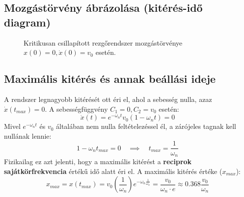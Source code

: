 \subsection*{Mozgástörvény ábrázolása (kitérés-idő diagram)}
\begin{figure}[H]
    \centering
    \caption{Kritikusan csillapított rezgőrendszer mozgástörvénye $x(0)=0, \dot{x}(0)=v_0$ esetén.}
\end{figure}

\newpage
\subsection*{Maximális kitérés és annak beállási ideje}
A rendszer legnagyobb kitérését ott éri el, ahol a sebesség nulla, azaz $\dot{x}(t_{max}) = 0$.
A sebességfüggvény $C_1 = 0, C_2 = v_0$ esetén:
\begin{equation}
    \dot{x}(t) = e^{-\omega_n t} v_0 ( 1 - \omega_n t ) = 0
\end{equation}
Mivel $e^{-\omega_n t}$ és $v_0$ általában nem nulla feltételezéssel él, a zárójeles tagnak kell nullának lennie:
\begin{equation}
    1 - \omega_n t_{max} = 0 \quad \implies \quad t_{max} = \frac{1}{\omega_n}
\end{equation}
Fizikailag ez azt jelenti, hogy a maximális kitérést a \textbf{reciprok sajátkörfrekvencia} értékű idő alatt éri el. A maximális kitérés értéke ($x_{max}$):
\begin{equation}
    x_{max} = x(t_{max}) = v_0 \left(\frac{1}{\omega_n}\right) e^{-\omega_n \frac{1}{\omega_n}} = \frac{v_0}{\omega_n \cdot e} \approx 0.368 \frac{v_0}{\omega_n}
\end{equation}
